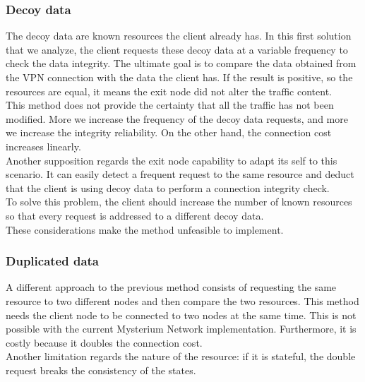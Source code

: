 \documentclass[12pt]{article}
\begin{document}
		\subsubsection{Decoy data}
		The decoy data are known resources the client already has.
		In this first solution that we analyze, the client requests these decoy data at a variable frequency to check the data integrity. The ultimate goal is to compare the data obtained from the VPN connection with the data the client has. If the result is positive, so the resources are equal, it means the exit node did not alter the traffic content.\\
		\bigbreak
		This method does not provide the certainty that all the traffic has not been modified. More we increase the frequency of the decoy data requests, and more we increase the integrity reliability. On the other hand, the connection cost increases linearly.\\
		Another supposition regards the exit node capability to adapt its self to this scenario. It can easily detect a frequent request to the same resource and deduct that the client is using decoy data to perform a connection integrity check.\\To solve this problem, the client should increase the number of known resources so that every request is addressed to a different decoy data.\\
		These considerations make the method unfeasible to implement.

		\subsubsection{Duplicated data}
		A different approach to the previous method consists of requesting the same resource to two different nodes and then compare the two resources. This method needs the client node to be connected to two nodes at the same time. This is not possible with the current Mysterium Network implementation. Furthermore, it is costly because it doubles the connection cost.\\
		Another limitation regards the nature of the resource: if it is stateful, the double request breaks the consistency of the states.

		 
\end{document}
